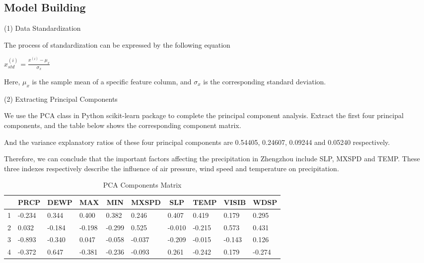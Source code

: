 \documentclass{swmcmthesis}
\begin{document}
\subsection{Model Building}
\hspace{1.25em}
(1) Data Standardization
\par
The process of standardization can be expressed by the following equation
\begin{center}
    $ x_{std}^{(i)}=\frac{x^{(i)}-\mu_{x}}{\sigma_{x}} $
\end{center}
\par 
Here, $\mu_{x}$ is the sample mean of a specific feature column, and $\sigma_{x}$ is the corresponding standard deviation.
\par 
(2) Extracting Principal Components
\par
We use the PCA class in Python scikit-learn package to complete the principal component analysis. Extract the first four principal components, and the table below shows the corresponding component matrix.
\par
And the variance explanatory ratios of these four principal components are 0.54405, 0.24607, 0.09244 and 0.05240 respectively.
\par
Therefore, we can conclude that the important factors affecting the precipitation in Zhengzhou include SLP, MXSPD and TEMP. These three indexes respectively describe the influence of air pressure, wind speed and temperature on precipitation.
\begin{table}[]
    \centering
    \caption{PCA Components Matrix}
    \begin{tabular}{clllllllll}
        \hline
          & \multicolumn{1}{c}{PRCP} & \multicolumn{1}{c}{DEWP} & \multicolumn{1}{c}{MAX} & \multicolumn{1}{c}{MIN} & \multicolumn{1}{c}{MXSPD} & \multicolumn{1}{c}{SLP} & \multicolumn{1}{c}{TEMP} & \multicolumn{1}{c}{VISIB} & \multicolumn{1}{c}{WDSP} \\ \hline
        1 & -0.234                   & 0.344                    & 0.400                   & 0.382                   & 0.246                     & 0.407                   & 0.419                    & 0.179                     & 0.295                    \\
        2 & 0.032                    & -0.184                   & -0.198                  & -0.299                  & 0.525                     & -0.010                  & -0.215                   & 0.573                     & 0.431                    \\
        3 & -0.893                   & -0.340                   & 0.047                   & -0.058                  & -0.037                    & -0.209                  & -0.015                   & -0.143                    & 0.126                    \\
        4 & -0.372                   & 0.647                    & -0.381                  & -0.236                  & -0.093                    & 0.261                   & -0.242                   & 0.179                     & -0.274                   \\ \hline
    \end{tabular}
\end{table}
\newpage
\end{document}
